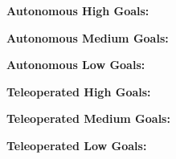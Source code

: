 \documentclass{article}
\begin{document}
{%
\noindent\begin{minipage}{.13\linewidth} %
	\begin{center}
		\textbf{Autonomous \linebreak High Goals:} \\[1em]
	\end{center}
\end{minipage}
\begin{minipage}{.15\linewidth} %
	\begin{center}
		\textbf{Autonomous \linebreak Medium Goals:} \\[1em]
	\end{center}
\end{minipage}
\begin{minipage}{.13\linewidth} %
	\begin{center}
		\textbf{Autonomous \linebreak Low Goals:} \\[1em]
	\end{center}
\end{minipage}
\hfill
\begin{minipage}{.13\linewidth} %
	\begin{center}
		\textbf{Teleoperated \linebreak High Goals:} \\[1em]
	\end{center}
\end{minipage}
\begin{minipage}{.15\linewidth} %
	\begin{center}
		\textbf{Teleoperated \linebreak Medium Goals:} \\[1em]
	\end{center}
\end{minipage}
\begin{minipage}{.13\linewidth} %
	\begin{center}
		\textbf{Teleoperated \linebreak Low Goals:} \\[1em]
	\end{center}
\end{minipage}
\\[1em]

\vfill

\begin{center}
\end{center}

}
	
\end{document}
